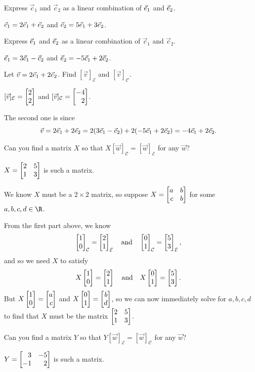 	\begin{parts}
		\item Express $\vec c_1$ and $\vec c_2$ as a linear combination of ${\vec e_1}$ and ${\vec e_2}$.
			\begin{solution}[inline]
				$\vec c_1=2{\vec e_1}+{\vec e_2}$ and $\vec c_2=5{\vec e_1}+3{\vec e_2}$.
			\end{solution}
		\item Express ${\vec e_1}$ and ${\vec e_2}$ as a linear combination of $\vec c_1$ and $\vec c_2$.
			\begin{solution}[inline]
				${\vec e_1}=3\vec c_1-\vec c_2$ and ${\vec e_2}=-5\vec c_1+2\vec c_2$.
			\end{solution}
		\item Let $\vec v=2{\vec e_1}+2{\vec e_2}$. Find $[\vec v]_{\mathcal E}$ and $[\vec v]_{\mathcal C}$.
			\begin{solution}
				$[\vec v]_{\mathcal E} = \mat{2\\2}$ and
				$[\vec v]_{\mathcal C} = \mat{-4\\2}$.

				The second one is since
				\[
					\vec v=2{\vec e_1}+2{\vec e_2}
					=2(3\vec c_1-\vec c_2)+2(-5\vec c_1+2\vec c_2)
					=-4\vec c_1+2\vec c_2.
				\]
			\end{solution}
		\item Can you find a matrix $X$ so that $X[\vec w]_{\mathcal C} = [\vec w]_{\mathcal E}$
			for any	$\vec w$?
			\begin{solution}
				$X = \mat{2&5\\1&3}$ is such a matrix.

				We know $X$ must be a $2\times2$ matrix, so suppose $X=\mat{a&b\\c&b}$
				for some $a,b,c,d\in\R$.

				From the first part above, we know
				\[
					\mat{1\\0}_{\mathcal C} = \mat{2\\1}_{\mathcal E}
					\quad \text{and} \quad
					\mat{0\\1}_{\mathcal C} = \mat{5\\3}_{\mathcal E},
				\]
				and so we need $X$ to satisfy
				\[
					X\mat{1\\0}=\mat{2\\1}
					\quad \text{and} \quad
					X\mat{0\\1}=\mat{5\\3}.
				\]
				But $X\mat{1\\0}=\mat{a\\c}$ and $X\mat{0\\1}=\mat{b\\d}$, so we
				can now immediately solve for $a,b,c,d$ to find that $X$ must be
				the matrix $\mat{2&5\\1&3}$.
			\end{solution}
		\item Can you find a matrix $Y$ so that $Y[\vec w]_{\mathcal E} = [\vec w]_{\mathcal C}$
			for any	$\vec w$?
			\begin{solution}
				$Y = \mat{3&-5\\-1&2}$ is such a matrix.


\end{solution}
\end{parts}
